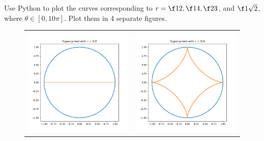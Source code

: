 \documentclass[a4paper]{article}
\begin{document}
\subsection{~} %

\begin{questionbody}
Use Python to plot the curves corresponding to $r = \f12, \f14, \f23$, and $\f1{\sqrt2}$, where $\theta \in [0, 10\pi]$. Plot them in 4 separate figures.
\end{questionbody}

\begin{figure}[hbtp]
	\centering
	\begin{tabular}{cc}
		\includegraphics[scale=0.4]{Q3a-1} & \includegraphics[scale=0.4]{Q3a-2}\\

\end{tabular}
\end{figure}
\end{document}
